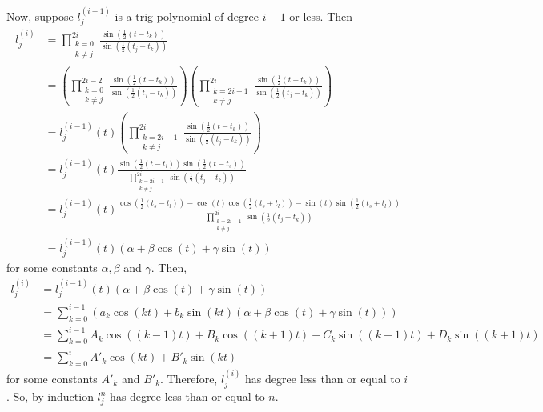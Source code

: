\documentclass[a4paper,12pt]{article}
\begin{document}
\begin{enumerate}[label = (\arabic*)]
	Now, suppose $ l_j^{(i - 1)} $ is a trig polynomial of degree $ i - 1 $ or less. Then
	\begin{align*}
		l_j^{(i)} &= \prod_{\substack{k = 0 \\ k \neq j}}^{2i} \frac{\sin\left(\frac{1}{2} (t - t_k)\right)}{\sin\left(\frac{1}{2} (t_j - t_k)\right)} \\
	   	&= \left(\prod_{\substack{k = 0 \\ k \neq j}}^{2i - 2} \frac{\sin\left(\frac{1}{2} (t - t_k)\right)}{\sin\left(\frac{1}{2} (t_j - t_k)\right)}\right) \left(\prod_{\substack{k = 2i - 1 \\ k \neq j}}^{2i} \frac{\sin\left(\frac{1}{2} (t - t_k)\right)}{\sin\left(\frac{1}{2} (t_j - t_k)\right)}\right) \\
	   	&= l_j^{(i -1)}(t) \left(\prod_{\substack{k = 2i - 1 \\ k \neq j}}^{2i} \frac{\sin\left(\frac{1}{2} (t - t_k)\right)}{\sin\left(\frac{1}{2} (t_j - t_k)\right)}\right) \\
	   	&= l_j^{(i -1)}(t) \frac{\sin\left(\frac{1}{2} (t - t_l)\right) \sin\left(\frac{1}{2} (t - t_s)\right)}{\prod\limits_{\substack{k = 2i - 1 \\ k \neq j}}^{2i} \sin\left(\frac{1}{2} (t_j - t_k)\right)} \\
	   	&= l_j^{(i -1)}(t) \frac{\cos\left(\frac{1}{2}(t_s - t_l)\right) - \cos(t)\cos\left(\frac{1}{2}(t_s + t_l)\right) - \sin(t)\sin\left(\frac{1}{2}(t_s + t_l)\right)}{\prod\limits_{\substack{k = 2i - 1 \\ k \neq j}}^{2i} \sin\left(\frac{1}{2} (t_j - t_k)\right)}\\
	   	&= l_j^{(i -1)}(t) \left(\alpha + \beta \cos(t) + \gamma \sin(t)\right)
	\end{align*}
	for some constants $ \alpha, \beta $ and $ \gamma $. Then, 
	\begin{align*}
		l_j^{(i)} &= l_j^{(i -1)}(t) \left(\alpha + \beta \cos(t) + \gamma \sin(t)\right) \\
		&= \sum_{k = 0}^{i - 1} \left(a_k \cos(k t) + b_k \sin(k t) \left(\alpha + \beta \cos(t) + \gamma \sin(t)\right)\right) \\
		&= \sum_{k = 0}^{i - 1} A_k \cos((k - 1) t) + B_k \cos((k + 1)t) + C_k \sin((k - 1) t) + D_k \sin((k + 1) t) \\
		&= \sum_{k = 0}^{i} A'_k \cos(k t) + B'_k \sin(k t)
	\end{align*}
	for some constants $ A'_k $ and $ B'_k $. Therefore, $ l_j^{(i)} $ has degree less than or equal to $ i $. So, by induction $ l_j^n $ has degree less than or equal to $ n $.
\end{enumerate}
\end{document}

